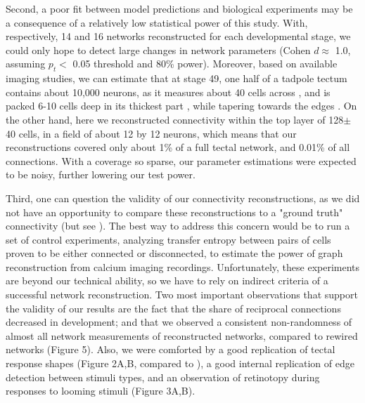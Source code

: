 \documentclass{article}
\begin{document}
Second, a poor fit between model predictions and biological experiments may be a consequence of a relatively low statistical power of this study. With, respectively, 14 and 16 networks reconstructed for each developmental stage, we could only hope to detect large changes in network parameters (Cohen $d \approx$ 1.0, assuming $p_t<$ 0.05 threshold and 80\% power). Moreover, based on available imaging studies, we can estimate that at stage 49, one half of a tadpole tectum contains about 10,000 neurons, as it measures about 40 cells across \citep{hiramoto2009}, and is packed 6-10 cells deep in its thickest part \citep{hewapathirane2008vivo}, while tapering towards the edges \citep{bollmann2009}. On the other hand, here we reconstructed connectivity within the top layer of 128$\pm$40 cells, in a field of about 12 by 12 neurons, which means that our reconstructions covered only about 1\% of a full tectal network, and 0.01\% of all connections. With a coverage so sparse, our parameter estimations were expected to be noisy, further lowering our test power.

Third, one can question the validity of our connectivity reconstructions, as we did not have an opportunity to compare these reconstructions to a "ground truth" connectivity (but see \citealt{xu2011}). The best way to address this concern would be to run a set of control experiments, analyzing transfer entropy between pairs of cells proven to be either connected or disconnected, to estimate the power of graph reconstruction from calcium imaging recordings. Unfortunately, these experiments are beyond our technical ability, so we have to rely on indirect criteria of a successful network reconstruction. Two most important observations that support the validity of our results are the fact that the share of reciprocal connections decreased in development; and that we observed a consistent non-randomness of almost all network measurements of reconstructed networks, compared to rewired networks (Figure 5). Also, we were comforted by a good replication of tectal response shapes (Figure 2A,B, compared to \citealt{khakhalin2014}), a good internal replication of edge detection between stimuli types, and an observation of retinotopy during responses to looming stimuli (Figure 3A,B).
\end{document}
